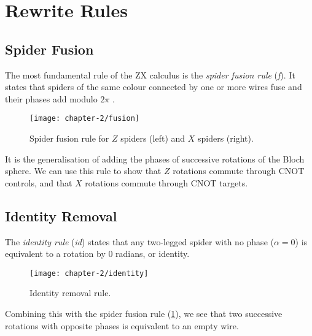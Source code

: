 \section{Rewrite Rules}%
\label{rewrite-rules}


\subsection{Spider Fusion}%
The most fundamental rule of the ZX calculus is the \textit{spider fusion rule} (\textit{f}). It states that spiders of the same colour connected by one or more wires fuse and their phases add modulo $2\pi$ \cite{Wetering2020}.

\begin{figure}[H]
    \centering
    \texttt{[image: chapter-2/fusion]}
    \caption{Spider fusion rule for $Z$ spiders (left) and $X$ spiders (right).}
    \label{spider-fusion}
\end{figure}

It is the generalisation of adding the phases of successive rotations of the Bloch sphere. We can use this rule to show that $Z$ rotations commute through CNOT controls, and that $X$ rotations commute through CNOT targets.



\subsection{Identity Removal}%

The \textit{identity rule} (\textit{id}) states that any two-legged spider with no phase ($\alpha = 0$) is equivalent to a rotation by 0 radians, or identity.

\begin{figure}[H]
    \centering
    \texttt{[image: chapter-2/identity]}
    \caption{Identity removal rule.}
    \label{identity}
\end{figure}

Combining this with the spider fusion rule (\ref{spider-fusion}), we see that two successive rotations with opposite phases is equivalent to an empty wire.


